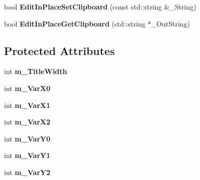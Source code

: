 \begin{DoxyCompactItemize}
\item 
\hypertarget{struct_c_tw_bar_ac334b4a78fdbb5355c740c42d32366e4}{bool {\bfseries Edit\+In\+Place\+Set\+Clipboard} (const std\+::string \&\+\_\+\+String)}\label{struct_c_tw_bar_ac334b4a78fdbb5355c740c42d32366e4}

\item 
\hypertarget{struct_c_tw_bar_a5f65c1c6352511be704f7aec220965fb}{bool {\bfseries Edit\+In\+Place\+Get\+Clipboard} (std\+::string $\ast$\+\_\+\+Out\+String)}\label{struct_c_tw_bar_a5f65c1c6352511be704f7aec220965fb}

\end{DoxyCompactItemize}
\subsection*{Protected Attributes}
\begin{DoxyCompactItemize}
\item 
\hypertarget{struct_c_tw_bar_a81db526cc87bb252525fdb84e8788440}{int {\bfseries m\+\_\+\+Title\+Width}}\label{struct_c_tw_bar_a81db526cc87bb252525fdb84e8788440}

\item 
\hypertarget{struct_c_tw_bar_a5ae49f2fe6dbe37e9f985d049cbcd08b}{int {\bfseries m\+\_\+\+Var\+X0}}\label{struct_c_tw_bar_a5ae49f2fe6dbe37e9f985d049cbcd08b}

\item 
\hypertarget{struct_c_tw_bar_a991c86e224edd04f5ea41975d1f295a5}{int {\bfseries m\+\_\+\+Var\+X1}}\label{struct_c_tw_bar_a991c86e224edd04f5ea41975d1f295a5}

\item 
\hypertarget{struct_c_tw_bar_aa5e0d54e5815d6cf6a9d979279c6bd69}{int {\bfseries m\+\_\+\+Var\+X2}}\label{struct_c_tw_bar_aa5e0d54e5815d6cf6a9d979279c6bd69}

\item 
\hypertarget{struct_c_tw_bar_ad619035667768f6577ca03176f4c90e8}{int {\bfseries m\+\_\+\+Var\+Y0}}\label{struct_c_tw_bar_ad619035667768f6577ca03176f4c90e8}

\item 
\hypertarget{struct_c_tw_bar_a5552c04ea9b6af03084f4fc751290257}{int {\bfseries m\+\_\+\+Var\+Y1}}\label{struct_c_tw_bar_a5552c04ea9b6af03084f4fc751290257}

\item 
\hypertarget{struct_c_tw_bar_ac5af83f1abc920071afb33e8d5d68db5}{int {\bfseries m\+\_\+\+Var\+Y2}}\label{struct_c_tw_bar_ac5af83f1abc920071afb33e8d5d68db5}


\end{DoxyCompactItemize}
